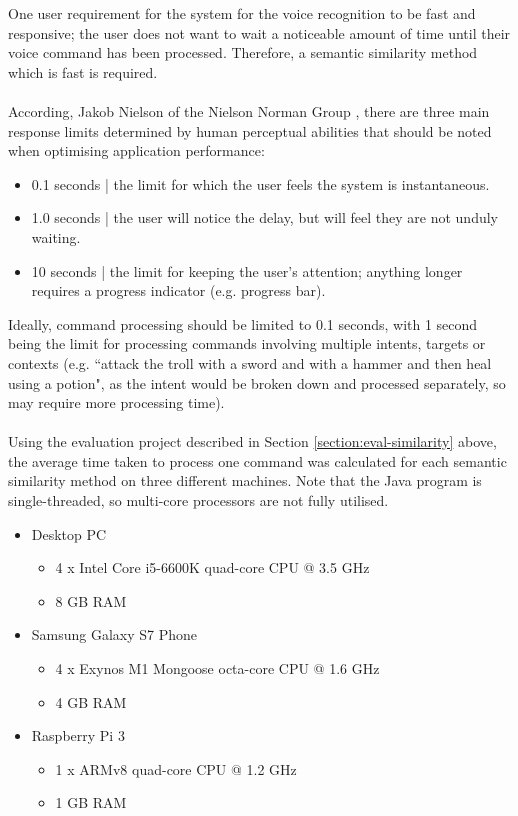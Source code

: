 \documentclass[11pt]{article}
\begin{document}
One user requirement for the system for the voice recognition to be fast and responsive; the user does not want to wait a noticeable amount of time until their voice command has been processed. Therefore, a semantic similarity method which is fast is required.
\\
\\
According, Jakob Nielson of the Nielson Norman Group \cite{RefWorks:128}, there are three main response limits determined by human perceptual abilities that should be noted when optimising application performance:

\begin{itemize}
\item 0.1 seconds | the limit for which the user feels the system is instantaneous.
\item 1.0 seconds | the user will notice the delay, but will feel they are not unduly waiting.
\item 10 seconds | the limit for keeping the user's attention; anything longer requires a progress indicator (e.g. progress bar).
\end{itemize}

Ideally, command processing should be limited to 0.1 seconds, with 1 second being the limit for processing commands involving multiple intents, targets or contexts (e.g. ``attack the troll with a sword and with a hammer and then heal using a potion", as the intent would be broken down and processed separately, so may require more processing time).
\\
\\
Using the evaluation project described in Section \ref{section:eval-similarity} above, the average time taken to process one command was calculated for each semantic similarity method on three different machines. Note that the Java program is single-threaded, so multi-core processors are not fully utilised.

\begin{itemize}
\item Desktop PC
	\begin{itemize}
	\item 4 x Intel Core i5-6600K quad-core CPU @ 3.5 GHz
	\item 8 GB RAM
	\end{itemize}
\item Samsung Galaxy S7 Phone
	\begin{itemize}
	\item 4 x Exynos M1 Mongoose octa-core CPU @ 1.6 GHz \cite{RefWorks:127}
	\item 4 GB RAM
	\end{itemize}
\item Raspberry Pi 3
	\begin{itemize}
	\item 1 x ARMv8 quad-core CPU @ 1.2 GHz \cite{RefWorks:126}
	\item 1 GB RAM
	\end{itemize}
\end{itemize}
\end{document}
